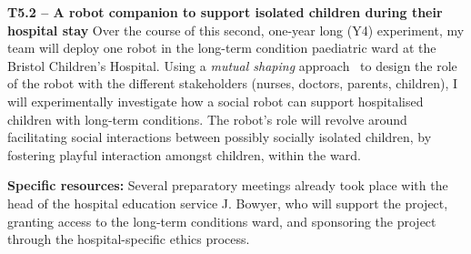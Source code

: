 \textbf{T5.2 -- A robot companion to support isolated children during their
hospital stay} Over the course of this second, one-year long (Y4)
experiment, my team will deploy one \project robot in the long-term condition
paediatric ward at the Bristol Children's Hospital.  Using a \emph{mutual shaping}
approach~\cite{winkle2018social} to design the role of the robot with the
different stakeholders (nurses, doctors, parents, children), I will
experimentally investigate how a social robot can support hospitalised children
with long-term conditions. The robot's role will revolve around facilitating
social interactions between possibly socially isolated children, by fostering
playful interaction amongst children, within the ward.

\textbf{Specific resources:} Several preparatory meetings already took place
with the head of the hospital education service J. Bowyer, who will support the
project, granting access to the long-term conditions ward, and sponsoring the
project through the hospital-specific ethics process.






